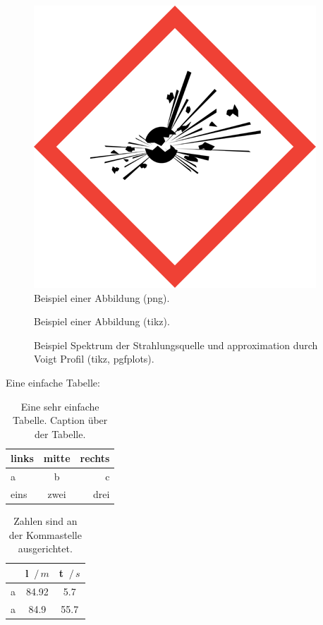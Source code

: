 \begin{figure}%
  \centering
  \includegraphics[scale=.3]{figures/GHS01}
  \caption{Beispiel einer Abbildung (png).}
  \label{fig:GHS01}
\end{figure}

\begin{figure}%
  \centering
  
  \caption{Beispiel einer Abbildung (tikz).}
  \label{fig:PasZelle}
\end{figure}


\begin{figure}%
  \centering
  
  \caption{Beispiel Spektrum der Strahlungsquelle und approximation durch Voigt Profil (tikz, pgfplots).}
  \label{fig:VoigtProfil}
\end{figure}

Eine einfache Tabelle:
\begin{table}%
  \centering
  \caption{Eine sehr einfache Tabelle. Caption über der Tabelle.}
	\label{tab:simple}
	\begin{tabular}{lcr}
        \toprule
        links & mitte & rechts \\
        \midrule
        a & b & c \\
        eins & zwei & drei \\
		\bottomrule
	\end{tabular}
\end{table}

\begin{table}%
  \centering
  \caption{Zahlen sind an der Kommastelle ausgerichtet.}
	\label{tab:simple2}
	\begin{tabular}{l*2{S[table-format=3.2]}}
        \toprule
         & l $\, /\, \si{m}$ & t $\, /\, \si{s}$ \\
        \midrule
        a & 84.92 & 5.7 \\
        a & 84.9 & 55.7 \\
		\bottomrule
	\end{tabular}
\end{table}

